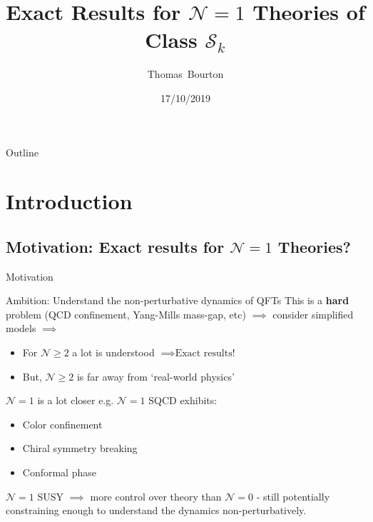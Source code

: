 \documentclass{beamer}
\title{Exact Results for $\mathcal{N}=1$ Theories of Class $\mathcal{S}_k$}
\author{Thomas~Bourton}
\institute[DESY] %
{
  DESY
  }
\date{17/10/2019}
\begin{document}
\begin{frame}
  \titlepage
\end{frame}

\begin{frame}{Outline}
  \tableofcontents
\end{frame}

\section{Introduction}
\subsection{Motivation: Exact results for $\mathcal{N}=1$ Theories?}
\begin{frame}{Motivation}
\begin{block}{Ambition: Understand the non-perturbative dynamics of QFTs} This is a \textbf{hard} problem (QCD confinement, Yang-Mills mass-gap, etc) $\implies$ consider simplified models $\implies$ 
\begin{itemize}
    \item For $\mathcal{N}\geq2$ a lot is understood $\implies \boxed{\text{Exact results!}}$
    \item But, $\mathcal{N}\geq2$ is far away from `real-world physics'
\end{itemize}
  $\mathcal{N}=1$ is a lot closer e.g. $\mathcal{N}=1$ SQCD exhibits:
  \begin{itemize}
      \item Color confinement
      \item Chiral symmetry breaking
    \item Conformal phase
  \end{itemize}
    $\mathcal{N}=1$ SUSY $\implies$ more control over theory than $\mathcal{N}=0$ - still potentially constraining enough to understand the dynamics non-perturbatively.\newline
    \end{block}
\end{frame}
\end{document}

